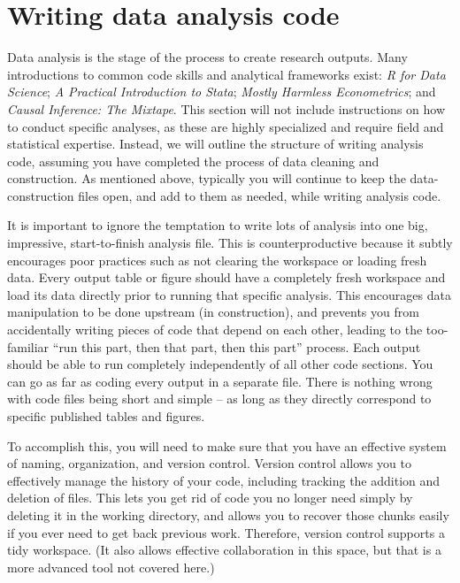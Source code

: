 
\section{Writing data analysis code}

Data analysis is the stage of the process to create research outputs.
Many introductions to common code skills and analytical frameworks exist:
\textit{R for Data Science};
\textit{A Practical Introduction to Stata};
\textit{Mostly Harmless Econometrics}; and
\textit{Causal Inference: The Mixtape}.
This section will not include instructions on how to conduct specific analyses,
as these are highly specialized and require field and statistical expertise.
Instead, we will outline the structure of writing analysis code,
assuming you have completed the process of data cleaning and construction.
As mentioned above, typically you will continue to keep
the data-construction files open, and add to them as needed,
while writing analysis code.

It is important to ignore the temptation to write lots of analysis
into one big, impressive, start-to-finish analysis file.
This is counterproductive because it subtly encourages poor practices
such as not clearing the workspace or loading fresh data.
Every output table or figure should have
a completely fresh workspace and load its data directly
prior to running that specific analysis.
This encourages data manipulation to be done upstream (in construction),
and prevents you from accidentally writing pieces of code
that depend on each other, leading to the too-familiar
``run this part, then that part, then this part'' process.
Each output should be able to run completely independently
of all other code sections.
You can go as far as coding every output in a separate file.
There is nothing wrong with code files being short and simple --
as long as they directly correspond to specific published tables and figures.

To accomplish this, you will need to make sure that you
have an effective system of naming, organization, and version control.
Version control allows you to effectively manage the history of your code,
including tracking the addition and deletion of files.
This lets you get rid of code you no longer need
simply by deleting it in the working directory,
and allows you to recover those chunks easily
if you ever need to get back previous work.
Therefore, version control supports a tidy workspace.
(It also allows effective collaboration in this space,
but that is a more advanced tool not covered here.)

